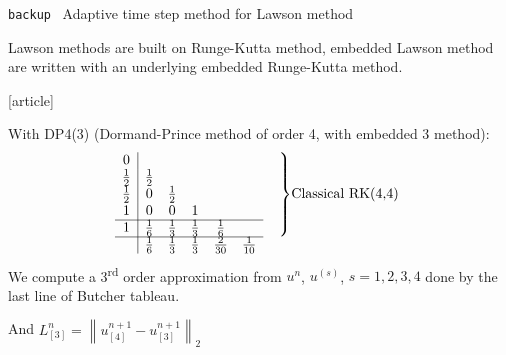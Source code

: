 \documentclass{beamer}
\newcommand{\customcite}[1]{\cite{#1}}
\newenvironment{bframe}[1]%
{%
  \begin{frame}{{\small\texttt{backup}\ } #1}
}%
{%
  \end{frame}
}
\begin{document}
\begin{bframe}{Adaptive time step method for Lawson method}
  Lawson methods are built on Runge-Kutta method, embedded Lawson method are written with an underlying embedded Runge-Kutta method.

  \begin{thebibliography}{9}
    [article]
     \customcite{Dormand:1978}
  \end{thebibliography}
  With DP4(3) (Dormand-Prince method of order 4, with embedded 3 method):
    $$
    \begin{array}{c|cccccc}
      0           &             &             &             &             &                & \multirow{5}{*}{$\left.\phantom{\begin{matrix}0\\1\\2\\3\\4\end{matrix}}\right\}$Classical RK(4,4)} \\
      \frac{1}{2} & \frac{1}{2} &             &             &             &                & \\
      \frac{1}{2} & 0           & \frac{1}{2} &             &             &                & \\
      1           & 0           & 0           & 1           &             &                & \\
    \cline{1-6}
      1           & \frac{1}{6} & \frac{1}{3} & \frac{1}{3} & \frac{1}{6} &                &\\
    \cline{1-6}
                  & \frac{1}{6} & \frac{1}{3} & \frac{1}{3} & \frac{2}{30} & \frac{1}{10}  & 
    \end{array}
  $$
  We compute a 3\textsuperscript{rd} order approximation from $u^n$, $u^{(s)}$, $s=1,2,3,4$ done by the last line of Butcher tableau.

  And $L^{n}_{[3]} = \left\| u^{n+1}_{[4]} - u^{n+1}_{[3]} \right\|_2$
\end{bframe}
\end{document}

